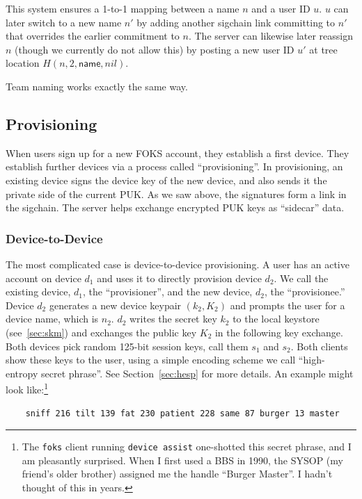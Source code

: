 This system ensures a 1-to-1 mapping between a name $n$ and a
user ID $u$. $u$ can later switch to a new name $n'$ by adding
another sigchain link committing to $n'$ that overrides the earlier
commitment to $n$. The server can likewise later reassign $n$
(though we currently do not allow this) by posting a new user ID
$u'$ at tree location $H(n, 2, \textsf{name}, nil)$.

Team naming works exactly the same way.

\subsection{Provisioning}

When users sign up for a new FOKS account, they establish a first device. They
establish further devices via a process called ``provisioning''. In
provisioning, an existing device signs the device key of the new device, and
also sends it the private side of the current PUK. As we saw above, the
signatures form a link in the sigchain. The server helps exchange encrypted PUK
keys as ``sidecar'' data.

\subsubsection{Device-to-Device}
\label{sec:kex}

The most complicated case is device-to-device provisioning. A user has an
active account on device $d_1$ and uses it to directly provision device $d_2$.
We call the existing device, $d_1$, the ``provisioner'', and the new device, $d_2$,
the ``provisionee.''
Device $d_2$ generates a new device keypair $(k_2,K_2)$ and prompts the user for
a device name, which is $n_2$. $d_2$ writes the secret key $k_2$ to the local keystore (see~\ref{sec:skm})
and exchanges the public key $K_2$ in the following key exchange.
Both devices pick random 125-bit session keys, call them $s_1$ and $s_2$. Both clients
show these keys to the user, using a simple encoding scheme we call
``high-entropy secret phrase''. See Section~\ref{sec:hesp} for more details.
An example might look like:\footnote{The \texttt{foks} client
running \texttt{device assist} one-shotted this secret phrase, and I am pleasantly surprised.
When I first used a BBS in 1990, the SYSOP (my friend's older brother) assigned me the 
handle ``Burger Master''. I hadn't thought of this in years.}

\begin{verbatim}
    sniff 216 tilt 139 fat 230 patient 228 same 87 burger 13 master
\end{verbatim}

